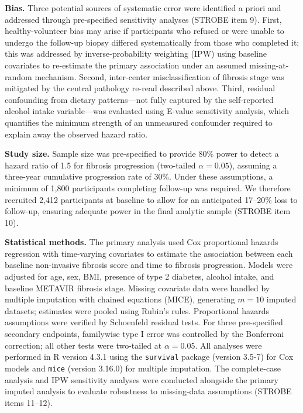 \documentclass[11pt,letterpaper]{article}
\begin{document}
\textbf{Bias.}
Three potential sources of systematic error were identified a priori and addressed through pre-specified sensitivity analyses (STROBE item 9). First, healthy-volunteer bias may arise if participants who refused or were unable to undergo the follow-up biopsy differed systematically from those who completed it; this was addressed by inverse-probability weighting (IPW) using baseline covariates to re-estimate the primary association under an assumed missing-at-random mechanism. Second, inter-center misclassification of fibrosis stage was mitigated by the central pathology re-read described above. Third, residual confounding from dietary patterns---not fully captured by the self-reported alcohol intake variable---was evaluated using E-value sensitivity analysis, which quantifies the minimum strength of an unmeasured confounder required to explain away the observed hazard ratio.

\textbf{Study size.}
Sample size was pre-specified to provide 80\% power to detect a hazard ratio of 1.5 for fibrosis progression (two-tailed $\alpha = 0.05$), assuming a three-year cumulative progression rate of 30\%. Under these assumptions, a minimum of 1{,}800 participants completing follow-up was required. We therefore recruited 2{,}412 participants at baseline to allow for an anticipated 17--20\% loss to follow-up, ensuring adequate power in the final analytic sample (STROBE item 10).

\textbf{Statistical methods.}
The primary analysis used Cox proportional hazards regression with time-varying covariates to estimate the association between each baseline non-invasive fibrosis score and time to fibrosis progression. Models were adjusted for age, sex, BMI, presence of type 2 diabetes, alcohol intake, and baseline METAVIR fibrosis stage. Missing covariate data were handled by multiple imputation with chained equations (MICE), generating $m = 10$ imputed datasets; estimates were pooled using Rubin's rules. Proportional hazards assumptions were verified by Schoenfeld residual tests. For three pre-specified secondary endpoints, familywise type I error was controlled by the Bonferroni correction; all other tests were two-tailed at $\alpha = 0.05$. All analyses were performed in R version 4.3.1 using the \texttt{survival} package (version 3.5-7) for Cox models and \texttt{mice} (version 3.16.0) for multiple imputation. The complete-case analysis and IPW sensitivity analyses were conducted alongside the primary imputed analysis to evaluate robustness to missing-data assumptions (STROBE items 11--12).
\end{document}
